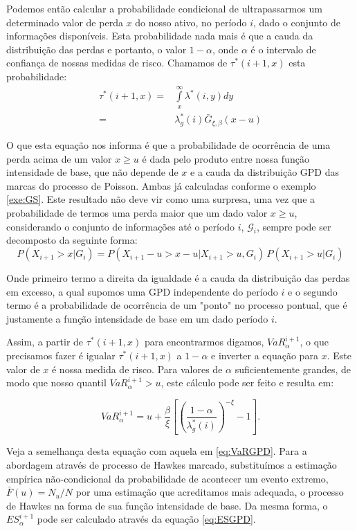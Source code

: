 \documentclass[review]{elsarticle}
\theoremstyle{definition}
\begin{document}
Podemos então calcular a probabilidade condicional de ultrapassarmos um determinado valor de perda $x$ do nosso ativo, no período $i$, dado o conjunto de informações disponíveis. Esta probabilidade nada mais é que a cauda da distribuição das perdas e portanto, o valor $1-\alpha$, onde $\alpha$ é o intervalo de confiança de nossas medidas de risco. Chamamos de $\tau^*(i+1, x)$ esta probabilidade:
\begin{align}
\label{eq:tau}
\tau^*(i+1, x)=&\displaystyle\int\limits_x^\infty \lambda^*(i, y)dy \nonumber \\
=&\lambda^*_g(i) \bar{G}_{\xi, \beta}(x-u)
\end{align}

O que esta equação nos informa é que a probabilidade de ocorrência de uma perda acima de um valor $x\geq u$ é dada pelo produto entre nossa função intensidade de base, que não depende de $x$ e a cauda da distribuição GPD das marcas do processo de Poisson. Ambas já calculadas conforme o exemplo \ref{exe:GS}. Este resultado não deve vir como uma surpresa, uma vez que a probabilidade de termos uma perda maior que um dado valor $x\geq u$, considerando o conjunto de informações até o período $i$, $\mathcal{G}_i$, sempre pode ser decomposto da seguinte forma:
\begin{equation*}
P(X_{i+1}>x|G_i)=P(X_{i+1}-u>x-u|X_{i+1}>u, G_i)\, P(X_{i+1}>u|G_i)
\end{equation*}

Onde primeiro termo a direita da igualdade é a cauda da distribuição das perdas em excesso, a qual supomos uma GPD independente do período $i$ e o segundo termo é a probabilidade de ocorrência de um "ponto" no processo pontual, que é justamente a função intensidade de base em um dado período $i$.

Assim, a partir de $\tau^*(i+1, x)$ para encontrarmos digamos, $VaR_\alpha^{i+1}$, o que precisamos fazer é igualar $\tau^*(i+1, x)$ a $1-\alpha$ e inverter a equação para $x$. Este valor de $x$ é nossa medida de risco. Para valores de $\alpha$ suficientemente grandes, de modo que nosso quantil $VaR_\alpha^{i+1} > u$, este cálculo pode ser feito e resulta em:

\begin{equation}
\label{eq:VaRpp}
VaR_\alpha^{i+1} = u+\frac{\beta}{\xi}\left[ \left( \frac{1-\alpha}{\lambda^*_g(i)}\right)^{-\xi}-1 \right].
\end{equation}

Veja a semelhança desta equação com aquela em \eqref{eq:VaRGPD}. Para a abordagem através de processo de Hawkes marcado, substituímos a estimação empírica não-condicional da probabilidade de acontecer um evento extremo, $\bar{F}(u)=N_u/N$ por uma estimação que acreditamos mais adequada, o processo de Hawkes na forma de sua função intensidade de base. Da mesma forma, o $ES_\alpha^{i+1}$ pode ser calculado através da equação \eqref{eq:ESGPD}.
\end{document}
